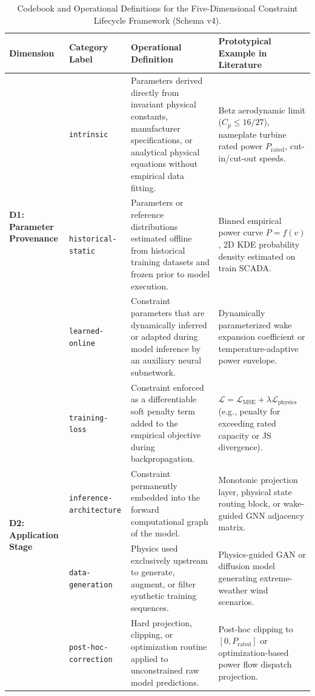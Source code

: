 \documentclass[preprint,3p,times]{elsarticle}
\begin{document}
\begin{table}[t]
\centering
\small
\caption{Codebook and Operational Definitions for the Five-Dimensional Constraint Lifecycle Framework (Schema v4).}
\label{tab:schema_codebook}
\begin{tabular}{p{2.8cm}p{3.2cm}p{5.5cm}p{4.2cm}}
\toprule
\textbf{Dimension} & \textbf{Category Label} & \textbf{Operational Definition} & \textbf{Prototypical Example in Literature} \\
\midrule
\multirow{3}{*}{\textbf{D1: Parameter Provenance}} 
& \texttt{intrinsic} & Parameters derived directly from invariant physical constants, manufacturer specifications, or analytical physical equations without empirical data fitting. & Betz aerodynamic limit ($C_p \le 16/27$), nameplate turbine rated power $P_{\text{rated}}$, cut-in/cut-out speeds. \\
& \texttt{historical-static} & Parameters or reference distributions estimated offline from historical training datasets and frozen prior to model execution. & Binned empirical power curve $P=f(v)$, 2D KDE probability density estimated on train SCADA. \\
& \texttt{learned-online} & Constraint parameters that are dynamically inferred or adapted during model inference by an auxiliary neural subnetwork. & Dynamically parameterized wake expansion coefficient or temperature-adaptive power envelope. \\
\midrule
\multirow{4}{*}{\textbf{D2: Application Stage}} 
& \texttt{training-loss} & Constraint enforced as a differentiable soft penalty term added to the empirical objective during backpropagation. & $\mathcal{L} = \mathcal{L}_{\text{MSE}} + \lambda \mathcal{L}_{\text{physics}}$ (e.g., penalty for exceeding rated capacity or JS divergence). \\
& \texttt{inference-architecture} & Constraint permanently embedded into the forward computational graph of the model. & Monotonic projection layer, physical state routing block, or wake-guided GNN adjacency matrix. \\
& \texttt{data-generation} & Physics used exclusively upstream to generate, augment, or filter synthetic training sequences. & Physics-guided GAN or diffusion model generating extreme-weather wind scenarios. \\
& \texttt{post-hoc-correction} & Hard projection, clipping, or optimization routine applied to unconstrained raw model predictions. & Post-hoc clipping to $[0, P_{\text{rated}}]$ or optimization-based power flow dispatch projection. \\

\end{tabular}
\end{table}
\end{document}
